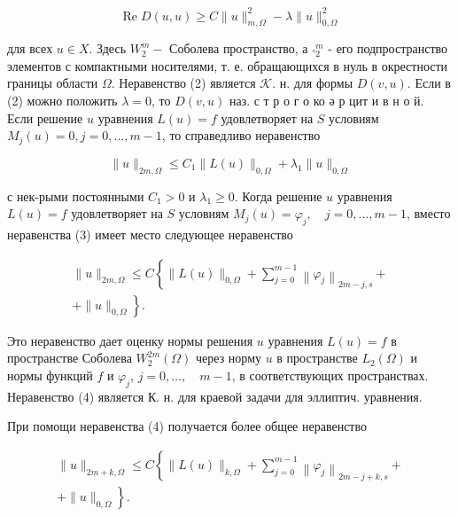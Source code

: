 \documentclass[10pt]{article}
\begin{document}
\[

\operatorname{Re} D(u, u) \geqslant C\|u\|_{m, \Omega}^{2}-\lambda\|u\|_{0, \Omega}^{2}

\]



для всех $u \in X$. Здесь $W_{2}^{m}-$ Соболева пространство, а $\stackrel{\circ}{ }_{2}^{m}$ - его подпространство элементов с компактными носителями, т. е. обращающихся в нуль в окрестности границы области $\Omega$. Неравенство (2) является $\mathcal{K}$. н. для формы $D(v, u)$. Если в (2) можно положить $\lambda=0$, то $D(v, u)$ наз. с т р о г о ко ә р цит и в н о й. Если решение $u$ уравнения $L(u)=f$ удовлетворяет на $S$ условиям $M_{j}(u)=0, j=0, \ldots, m-1$, то справедливо неравенство



\[

\|u\|_{2 m, \Omega} \leqslant C_{1}\|L(u)\|_{0, \Omega}+\lambda_{1}\|u\|_{0, \Omega}

\]



с нек-рыми постоянными $C_{1}>0$ и $\lambda_{1} \geqslant 0$. Когда решение $u$ уравнения $L(u)=f$ удовлетворяет на $S$ условиям $M_{j}(u)=\varphi_{j}, \quad j=0, \ldots, m-1$, вместо неравенства (3) имеет место следующее неравенство



\[

\begin{gathered}

\|u\|_{2 m, \Omega} \leqslant C\left\{\|L(u)\|_{0, \Omega}+\sum_{j=0}^{m-1}\left\|\varphi_{j}\right\|_{2 m-j, s}+\right. \\

\left.+\|u\|_{0, \Omega}\right\} .

\end{gathered}

\]



Это неравенство дает оценку нормы решения $u$ уравнения $L(u)=f$ в пространстве Соболева $W_{2}^{2 m}(\Omega)$ через норму $u$ в пространстве $L_{2}(\Omega)$ и нормы функций $f$ и $\varphi_{j}$, $j=0, \ldots, \quad m-1$, в соответствующих пространствах. Неравенство (4) является К. н. для краевой задачи для эллиптич. уравнения.



При помощи неравенства (4) получается более общее неравенство



\[

\begin{gathered}

\|u\|_{2 m+k, \Omega} \leqslant C\left\{\|L(u)\|_{k, \Omega}+\sum_{j=0}^{m-1}\left\|\varphi_{j}\right\|_{2 m-j+k, s}+\right. \\

\left.+\|u\|_{0, \Omega}\right\} .

\end{gathered}

\]
\end{document}
